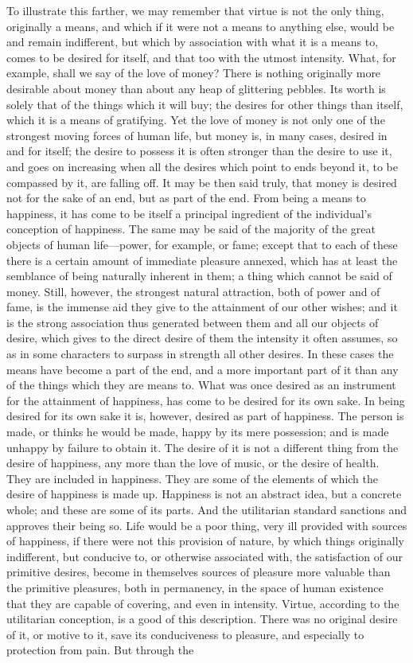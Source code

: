 \documentclass[12pt]{report}
\begin{document}
To illustrate this farther, we may remember that virtue is not the only thing, originally a means, and which if it were not a means to anything else, would be and remain indifferent, but which by association with what it is a means to, comes to be desired for itself, and that too with the utmost intensity. What, for example, shall we say of the love of money? There is nothing originally more desirable about money than about any heap of glittering pebbles. Its worth is solely that of the things which it will buy; the desires for other things than itself, which it is a means of gratifying. Yet the love of money is not only one of the strongest moving forces of human life, but money is, in many cases, desired in and for itself; the desire to possess it is often stronger than the desire to use it, and goes on increasing when all the desires which point to ends beyond it, to be compassed by it, are falling off. It may be then said truly, that money is desired not for the sake of an end, but as part of the end. From being a means to happiness, it has come to be itself a principal ingredient of the individual's conception of happiness. The same may be said of the majority of the great objects of human life—power, for example, or fame; except that to each of these there is a certain amount of immediate pleasure annexed, which has at least the semblance of being naturally inherent in them; a thing which cannot be said of money. Still, however, the strongest natural attraction, both of power and of fame, is the immense aid they give to the attainment of our other wishes; and it is the strong association thus generated between them and all our objects of desire, which gives to the direct desire of them the intensity it often assumes, so as in some characters to surpass in strength all other desires. In these cases the means have become a part of the end, and a more important part of it than any of the things which they are means to. What was once desired as an instrument for the attainment of happiness, has come to be desired for its own sake. In being desired for its own sake it is, however, desired as part of happiness. The person is made, or thinks he would be made, happy by its mere possession; and is made unhappy by failure to obtain it. The desire of it is not a different thing from the desire of happiness, any more than the love of music, or the desire of health. They are included in happiness. They are some of the elements of which the desire of happiness is made up. Happiness is not an abstract idea, but a concrete whole; and these are some of its parts. And the utilitarian standard sanctions and approves their being so. Life would be a poor thing, very ill provided with sources of happiness, if there were not this provision of nature, by which things originally indifferent, but conducive to, or otherwise associated with, the satisfaction of our primitive desires, become in themselves sources of pleasure more valuable than the primitive pleasures, both in permanency, in the space of human existence that they are capable of covering, and even in intensity. Virtue, according to the utilitarian conception, is a good of this description. There was no original desire of it, or motive to it, save its conduciveness to pleasure, and especially to protection from pain. But through the 
\end{document}
